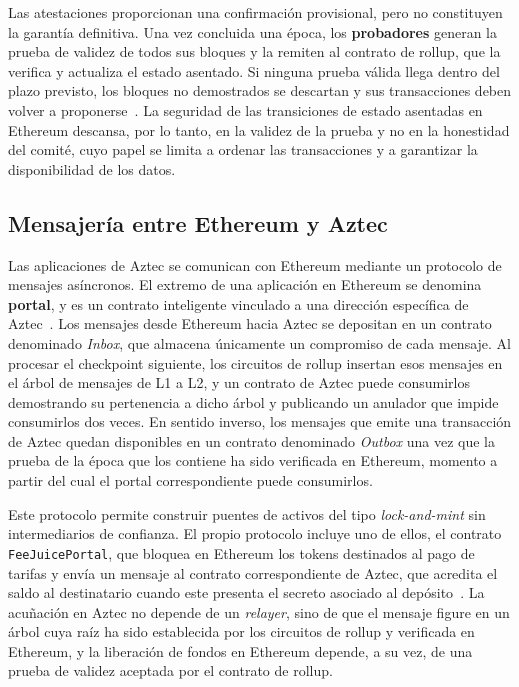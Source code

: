Las atestaciones proporcionan una confirmación provisional, pero no constituyen la garantía
definitiva. Una vez concluida una época, los \textbf{probadores} generan la prueba de validez de
todos sus bloques y la remiten al contrato de rollup, que la verifica y actualiza el estado
asentado. Si ninguna prueba válida llega dentro del plazo previsto, los bloques no demostrados se
descartan y sus transacciones deben volver a proponerse~\cite{aztecblocks}. La seguridad de las
transiciones de estado asentadas en Ethereum descansa, por lo tanto, en la validez de la prueba y
no en la honestidad del comité, cuyo papel se limita a ordenar las transacciones y a garantizar la
disponibilidad de los datos.

\subsection{Mensajería entre Ethereum y Aztec}
\label{sec:aztec_mensajeria}

Las aplicaciones de Aztec se comunican con Ethereum mediante un protocolo de mensajes asíncronos.
El extremo de una aplicación en Ethereum se denomina \textbf{portal}, y es un contrato inteligente
vinculado a una dirección específica de Aztec~\cite{aztecmessaging}. Los mensajes desde Ethereum
hacia Aztec se depositan en un contrato denominado \textit{Inbox}, que almacena únicamente un
compromiso de cada mensaje. Al procesar el checkpoint siguiente, los circuitos de rollup insertan
esos mensajes en el árbol de mensajes de L1 a L2, y un contrato de Aztec puede consumirlos
demostrando su pertenencia a dicho árbol y publicando un anulador que impide consumirlos dos
veces. En sentido inverso, los mensajes que emite una transacción de Aztec quedan disponibles en
un contrato denominado \textit{Outbox} una vez que la prueba de la época que los contiene ha sido
verificada en Ethereum, momento a partir del cual el portal correspondiente puede consumirlos.

Este protocolo permite construir puentes de activos del tipo \textit{lock-and-mint} sin
intermediarios de confianza. El propio protocolo incluye uno de ellos, el contrato
\texttt{FeeJuicePortal}, que bloquea en Ethereum los tokens destinados al pago de tarifas y envía
un mensaje al contrato correspondiente de Aztec, que acredita el saldo al destinatario cuando este
presenta el secreto asociado al depósito~\cite{aztecfees}. La acuñación en Aztec no depende de un
\textit{relayer}, sino de que el mensaje figure en un árbol cuya raíz ha sido establecida por los
circuitos de rollup y verificada en Ethereum, y la liberación de fondos en Ethereum depende, a su
vez, de una prueba de validez aceptada por el contrato de rollup.

